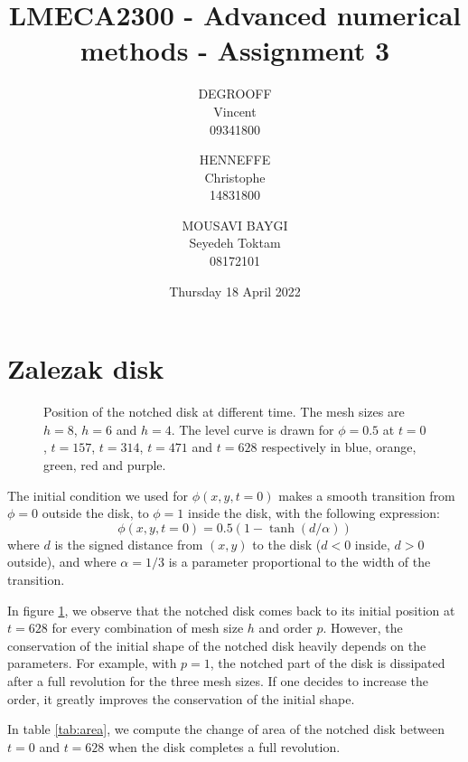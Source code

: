 \documentclass[11 pt]{article}
\title{LMECA2300 - Advanced numerical methods - Assignment 3}
\author{
    DEGROOFF\\ Vincent\\ 09341800
    \and
    HENNEFFE\\ Christophe\\ 14831800
    \and
    MOUSAVI BAYGI\\ Seyedeh Toktam\\ 08172101
}
\date{Thursday 18 April 2022}
\begin{document}
\maketitle

\section{Zalezak disk}
\begin{figure}[H]
    \centering
    
    \caption{Position of the notched disk at different time. The mesh sizes are $h=8$, $h=6$ and $h=4$. The level curve is drawn for $\phi=0.5$ at $t=0$, $t=157$, $t=314$, $t=471$ and $t=628$ respectively in blue, orange, green, red and purple.}
    \label{fig:zalezak}
\end{figure}

The initial condition we used for $\phi(x,y,t=0)$ makes a smooth transition from $\phi = 0$ outside the disk, to $\phi = 1$ inside the disk, with the following expression:
\[
\phi(x,y,t=0) = 0.5 \left(1 - \tanh(d / \alpha)\right)
\]
where $d$ is the signed distance from $(x,y)$ to the disk ($d<0$ inside, $d>0$ outside), and where $\alpha=1/3$ is a parameter proportional to the width of the transition.

In figure \ref{fig:zalezak}, we observe that the notched disk comes back to its initial position at $t=628$ for every combination of mesh size $h$ and order $p$. However, the conservation of the initial shape of the notched disk heavily depends on the parameters. For example, with $p=1$, the notched part of the disk is dissipated after a full revolution for the three mesh sizes. If one decides to increase the order, it greatly improves the conservation of the initial shape.

In table \ref{tab:area}, we compute the change of area of the notched disk between $t=0$ and $t=628$ when the disk completes a full revolution.
\end{document}
